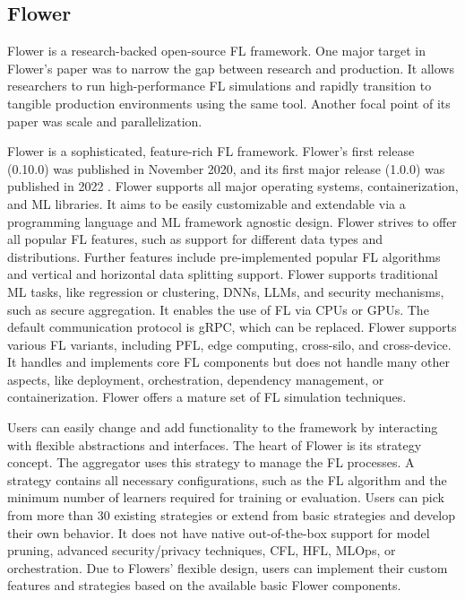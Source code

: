 \subsection{Flower}

Flower \cite{paper:flower} is a research-backed open-source FL framework.
One major target in Flower's paper was to narrow the gap between research and production.
It allows researchers to run high-performance FL simulations and rapidly transition to tangible production environments using the same tool.
Another focal point of its paper was scale and parallelization.

Flower is a sophisticated, feature-rich FL framework.
Flower's first release (0.10.0) was published in November 2020, and its first major release (1.0.0) was published in 2022 \cite{fl_framework:flower}.
Flower supports all major operating systems, containerization, and ML libraries.
It aims to be easily customizable and extendable via a programming language and ML framework agnostic design.
Flower strives to offer all popular FL features, such as support for different data types and distributions.
Further features include pre-implemented popular FL algorithms and vertical and horizontal data splitting support.
Flower supports traditional ML tasks, like regression or clustering, DNNs, LLMs, and security mechanisms, such as secure aggregation.
It enables the use of FL via CPUs or GPUs.
The default communication protocol is gRPC, which can be replaced.
Flower supports various FL variants, including PFL, edge computing, cross-silo, and cross-device.
It handles and implements core FL components but does not handle many other aspects, like deployment, orchestration, dependency management, or containerization.
Flower offers a mature set of FL simulation techniques.

Users can easily change and add functionality to the framework by interacting with flexible abstractions and interfaces.
The heart of Flower is its strategy concept.
The aggregator uses this strategy to manage the FL processes.
A strategy contains all necessary configurations, such as the FL algorithm and the minimum number of learners required for training or evaluation.
Users can pick from more than 30 existing strategies \cite{flower:strategies} or extend from basic strategies and develop their own behavior.
It does not have native out-of-the-box support for model pruning, advanced security/privacy techniques, CFL, HFL, MLOps, or orchestration.
Due to Flowers' flexible design, users can implement their custom features and strategies based on the available basic Flower components.

